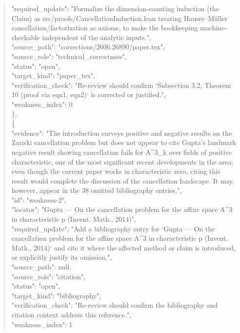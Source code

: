 \documentclass[11pt]{article}
\begin{document}
\begin{quote}
      "required\_update": "Formalize the dimension-counting induction (the Claim) as src/proofs/CancellationInduction.lean treating Hauser--Müller cancellation/factorization as axioms, to make the bookkeeping machine-checkable independent of the analytic inputs.",\\
      "source\_path": "corrections/2606.26890/paper.tex",\\
      "source\_role": "technical\_correctness",\\
      "status": "open",\\
      "target\_kind": "paper\_tex",\\
      "verification\_check": "Re-review should confirm `Subsection 3.2, Theorem 10 (proof via eqn1, eqn2)` is corrected or justified.",\\
      "weakness\_index": 0\\
    \},\\
    \{\\
      "evidence": "The introduction surveys positive and negative results on the Zariski cancellation problem but does not appear to cite Gupta's landmark negative result showing cancellation fails for A\^{}3\_k over fields of positive characteristic, one of the most significant recent developments in the area; even though the current paper works in characteristic zero, citing this result would complete the discussion of the cancellation landscape. It may, however, appear in the 38 omitted bibliography entries.",\\
      "id": "weakness-2",\\
      "locator": "Gupta --- On the cancellation problem for the affine space A\^{}3 in characteristic p (Invent. Math., 2014)",\\
      "required\_update": "Add a bibliography entry for `Gupta --- On the cancellation problem for the affine space A\^{}3 in characteristic p (Invent. Math., 2014)` and cite it where the affected method or claim is introduced, or explicitly justify its omission.",\\
      "source\_path": null,\\
      "source\_role": "citation",\\
      "status": "open",\\
      "target\_kind": "bibliography",\\
      "verification\_check": "Re-review should confirm the bibliography and citation context address this reference.",\\
      "weakness\_index": 1\\

\end{quote}
\end{document}
